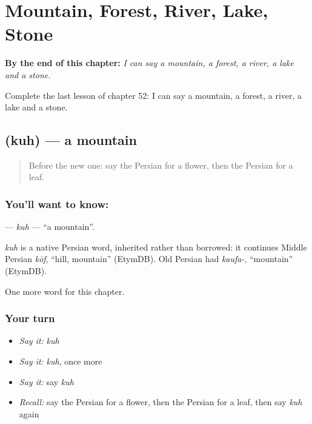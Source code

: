 
\chapter{Mountain, Forest, River, Lake, Stone}
\label{ch:fa-mountain-forest-river-lake-stone}

\begin{chapteropening}
\textbf{By the end of this chapter:} \emph{I can say a mountain, a forest, a river, a lake and a stone.}

Complete the last lesson of chapter 52: I can say a mountain, a forest, a river, a lake and a stone.
\end{chapteropening}

\section[\texorpdfstring{\fa{کوه} (kuh)}{کوه (kuh)}]{ (kuh) — a mountain}

\label{lesson:FA-C52-kuh}



\begin{quote}
Before the new one: say the Persian for a flower, then the Persian for a leaf.
\end{quote}

\subsection*{You'll want to know: }
\textbf{} — \emph{kuh} — \textquotedblleft{}a mountain\textquotedblright{}.

\begin{cousinweb}
\emph{kuh} is a native Persian word, inherited rather than borrowed: it continues Middle Persian \emph{kōf}, \textquotedblleft{}hill, mountain\textquotedblright{} (EtymDB). Old Persian had \emph{kaufa-}, \textquotedblleft{}mountain\textquotedblright{} (EtymDB).
\end{cousinweb}

\begin{grammarlens}[title={What you've built}]
One more word for this chapter.
\end{grammarlens}

\subsection*{Your turn}
\begin{itemize}
\raggedright
  \item \emph{Say it:} \emph{kuh}
  \item \emph{Say it:} \emph{kuh}, once more
  \item \emph{Say it:} say \emph{kuh}
  \item \emph{Recall:} say the Persian for a flower, then the Persian for a leaf, then say \emph{kuh} again
\end{itemize}

